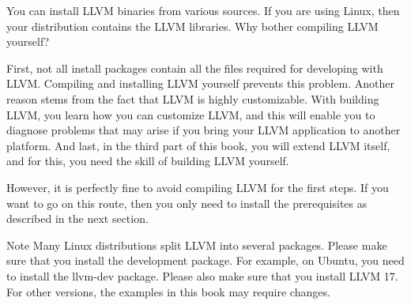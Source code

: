 You can install LLVM binaries from various sources. If you are using Linux, then your distribution contains the LLVM libraries. Why bother compiling LLVM yourself? 

First, not all install packages contain all the files required for developing with LLVM. Compiling and installing LLVM yourself prevents this problem. Another reason stems from the fact that LLVM is highly customizable. With building LLVM, you learn how you can customize LLVM, and this will enable you to diagnose problems that may arise if you bring your LLVM application to another platform. And last, in the third part of this book, you will extend LLVM itself, and for this, you need the skill of building LLVM yourself.

However, it is perfectly fine to avoid compiling LLVM for the first steps. If you want to go on this route, then you only need to install the prerequisites as described in the next section.


\begin{myNotic}{Note}
Many Linux distributions split LLVM into several packages. Please make sure that you install
the development package. For example, on Ubuntu, you need to install the llvm-dev package.
Please also make sure that you install LLVM 17. For other versions, the examples in this book
may require changes.
\end{myNotic}